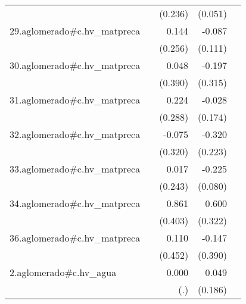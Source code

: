 {\begin{longtable}{l*{4}{D{.}{.}{-1}}}
            &                     &     (0.236)         &     (0.051)         &                     \\
\addlinespace
29.aglomerado#c.hv\_matpreca&                     &       0.144         &      -0.087         &                     \\
            &                     &     (0.256)         &     (0.111)         &                     \\
\addlinespace
30.aglomerado#c.hv\_matpreca&                     &       0.048         &      -0.197         &                     \\
            &                     &     (0.390)         &     (0.315)         &                     \\
\addlinespace
31.aglomerado#c.hv\_matpreca&                     &       0.224         &      -0.028         &                     \\
            &                     &     (0.288)         &     (0.174)         &                     \\
\addlinespace
32.aglomerado#c.hv\_matpreca&                     &      -0.075         &      -0.320         &                     \\
            &                     &     (0.320)         &     (0.223)         &                     \\
\addlinespace
33.aglomerado#c.hv\_matpreca&                     &       0.017         &      -0.225\sym{**} &                     \\
            &                     &     (0.243)         &     (0.080)         &                     \\
\addlinespace
34.aglomerado#c.hv\_matpreca&                     &       0.861\sym{*}  &       0.600         &                     \\
            &                     &     (0.403)         &     (0.322)         &                     \\
\addlinespace
36.aglomerado#c.hv\_matpreca&                     &       0.110         &      -0.147         &                     \\
            &                     &     (0.452)         &     (0.390)         &                     \\
\addlinespace
2.aglomerado#c.hv\_agua&                     &       0.000         &       0.049         &                     \\
            &                     &         (.)         &     (0.186)         &                     \\

\end{longtable}}
